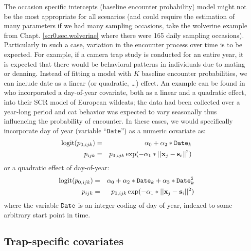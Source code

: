 The 
occasion specific intercepts (baseline encounter probability) model might not be the most
appropriate for all scenarios (and could require the estimation of
many parameters if we had many sampling occasions, take the wolverine
example from Chapt. \ref{scr0.sec.wolverine} where there were 165
daily sampling occasions).  Particularly in such a case, variation in
the encounter process over time is to be expected. For
example, if a camera trap study is conducted for an entire year, it is
expected that there would be behavioral patterns in individuals due to 
mating or denning. Instead of fitting a model with $K$ baseline
encounter probabilities, we can include date as a linear (or
quadratic, \ldots) effect. An example can be found in
\citet{kery_etal:2011} who incorporated a day-of-year covariate, both
as a linear and a quadratic effect, into their SCR model of European
wildcats; the data had been collected over a year-long period and cat
behavior was expected to vary seasonally thus influencing the
probability of encounter.  In these cases, we would specifically
incorporate day of year (variable ``\mbox{\tt Date}'') as a numeric
covariate as:
\begin{eqnarray*}
\mbox{logit}(p_{0,ijk}) &=& \alpha_0 + \alpha_2*\mbox{\tt Date}_{k} \\
p_{ijk} &= &p_{0, ijk} \exp(- \alpha_1*||{\bf x}_{j}-{\bf s}_{i}||^2)
\end{eqnarray*}
or a quadratic effect of day-of-year:
\begin{eqnarray*}
\mbox{logit}(p_{0,ijk})& =& \alpha_0 + \alpha_2*\mbox{\tt Date}_{k}
 + \alpha_3*\mbox{\tt Date}_{k}^{2} \\
p_{ijk} &= &p_{0,ijk} \exp(- \alpha_{1}*||{\bf x}_{j}-{\bf s}_{i}||^2)
\end{eqnarray*}
where the variable $\mbox{\tt Date}$ is an integer coding of
day-of-year, indexed to some arbitrary start point in time.



\subsection{Trap-specific covariates}

